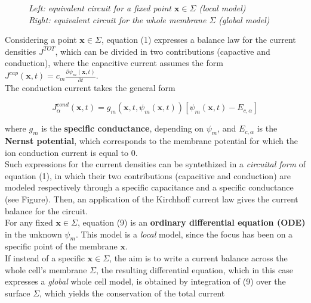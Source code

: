 \documentclass[a4paper]{article}
\begin{document}
\begin{figure}[H]
\begin{minipage}{\linewidth}
\begin{minipage}{0.48\linewidth}
\begin{figure}[H]
				\end{figure}
			\end{minipage}
			
		\end{minipage}
		\caption{\textit{Left: equivalent circuit for a fixed point $\textbf{x} \in \Sigma$ (local model)  \\
				Right: equivalent circuit for the whole membrane  $\Sigma$ (global model)}}
	\end{figure}

	
	Considering  a point $\textbf{x} \in \Sigma$, equation (1) expresses a balance law for the current densities $J^{TOT}$, which can be divided in two contributions (capactive and conduction), where the capacitive current assumes the form $J^{cap}(\textbf{x},t) = c_m \frac{\partial \psi_m(\textbf{x},t)}{\partial t}$.\\
	The conduction current takes the general form 
	
	\begin{equation}
		J^{cond}_{\alpha}(\textbf{x},t) = g_m(\textbf{x},t,\psi_m(\textbf{x},t)) [\psi_m(\textbf{x},t) - E_{c,\alpha}]
	\end{equation}
	
	where $g_m$ is the \textbf{specific conductance}, depending on $\psi_m$, and $E_{c,\alpha}$ is the \textbf{Nernst potential}, which corresponds to the  membrane potential for which the ion conduction current is equal to $0$.\\
Such expressions for the current densities can be syntethized in a \textit{circuital form} of equation (1), in which their two contributions (capacitive and conduction) are modeled respectively through a specific capacitance and a specific conductance (see Figure). Then, an application of the Kirchhoff current law  gives the current balance for the circuit.\\
For any fixed $\textbf{x} \in \Sigma$,  equation (9) is an \textbf{ordinary differential equation (ODE)} in the unknown $\psi_m$. This model is a \textit{local} model, since the focus has been on a specific point of the membrane $\textbf{x}$.
\\
	If instead of a specific $\textbf{x} \in \Sigma$, the aim is to write a current balance across the whole cell's membrane $\Sigma$, the resulting differential equation, which in this case expresses a \textit{global} whole cell model, is obtained by integration of (9) over the surface $\Sigma$,  which yields the conservation of the total current 
	
\end{document}
